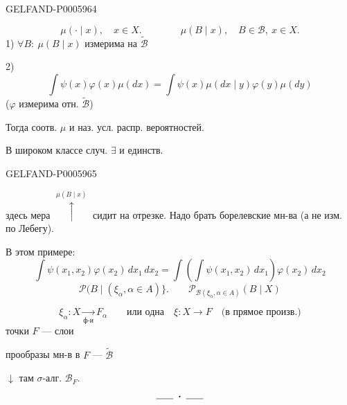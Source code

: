 \begin{GelfandAdjacentEvidence}{GELFAND-P000596}{4}

\[
\mu(\cdot\mid x),\quad x\in X.
\qquad\qquad
\mu(B\mid x),\quad B\in\mathcal B,\ x\in X.
\]
1) \(\forall B:\ \mu(B\mid x)\) измерима на \(\widetilde{\mathcal B}\)

2)
\[
\int\psi(x)\varphi(x)\mu(dx)=
\int\psi(x)\mu(dx\mid y)\varphi(y)\mu(dy)
\]
(\(\varphi\) измерима отн. \(\widetilde{\mathcal B}\))

Тогда соотв. \(\mu\) и наз. усл. распр. вероятностей.

В широком классе случ. \(\exists\) и единств.

\end{GelfandAdjacentEvidence}
\begin{GelfandAdjacentEvidence}{GELFAND-P000596}{5}

здесь мера \(\overset{\mu(B\mid x)}{\uparrow}\) сидит на отрезке.
Надо брать борелевские мн-ва (а не изм. по Лебегу).

В этом примере:
\[
\int\psi(x_1,x_2)\varphi(x_2)\,dx_1\,dx_2
=\int\left(\int\psi(x_1,x_2)\,dx_1\right)\varphi(x_2)\,dx_2
\]
\[
\mathcal P\bigl(B\mid(\xi_\alpha,\alpha\in A)\bigr\}.
\qquad \mathcal P_{\mathcal B(\xi_\alpha,\alpha\in A)}(B\mid X)
\]
\end{GelfandAdjacentEvidence}

\[
\xi_\alpha:X\underset{\text{ф-и}}{\longrightarrow}F_\alpha
\qquad\text{или одна}\quad \xi:X\to F\quad\text{(в прямое произв.)}
\]
точки \(F\) — слои

прообразы мн-в в \(F\) — \(\widetilde{\mathcal B}\)

\(\downarrow\) там \(\sigma\)-алг. \(\mathcal B_F\).
\[\rule{1.8em}{.4pt}\;\boldsymbol{\cdot}\;\rule{1.8em}{.4pt}\]


